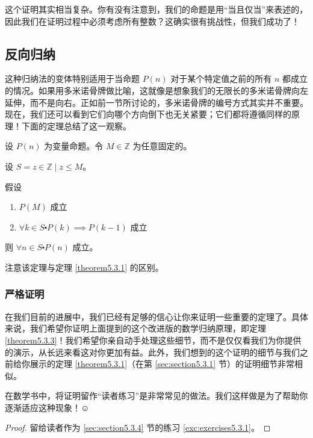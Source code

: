 这个证明其实相当复杂。你有没有注意到，我们的命题是用``当且仅当''来表述的，因此我们在证明过程中必须考虑所有整数？这确实很有挑战性，但我们成功了！

\subsection{反向归纳}

这种归纳法的变体特别适用于当命题 $P(n)$ 对于某个特定值之前的所有 $n$ 都成立的情况。如果用多米诺骨牌做比喻，这就像是想象我们的无限长的多米诺骨牌向左延伸，而不是向右。正如前一节所讨论的，多米诺骨牌的编号方式其实并不重要。现在，我们还可以看到它们向哪个方向倒下也无关紧要；它们都将遵循同样的原理！下面的定理总结了这一观察。

\begin{theorem}[反向归纳]\label{theorem5.3.3}
    设 $P(n)$ 为变量命题。令 $M \in \mathbb{Z}$ 为任意固定的。

    设 $S = {z \in \mathbb{Z} \mid z \le M}$。

    假设
    \begin{enumerate}[label=(\arabic*)]
        \item $P(M)$ 成立
        \item $\forall k \in S \centerdot P(k) \implies P(k - 1)$ 成立
    \end{enumerate}

    则 $\forall n \in S \centerdot P(n)$ 成立。
\end{theorem}

注意该定理与定理 \ref{theorem5.3.1} 的区别。

\subsubsection*{严格证明}

在我们目前的进展中，我们已经有足够的信心让你来证明一些重要的定理了。具体来说，我们希望你证明上面提到的这个改进版的数学归纳原理，即定理 \ref{theorem5.3.3}！我们希望你亲自动手处理这些细节，而不是仅仅看我们为你提供的演示，从长远来看这对你更加有益。此外，我们想到的这个证明的细节与我们之前给你展示的定理 \ref{theorem5.3.1}（在第 \ref{sec:section5.3.1} 节）的证明细节非常相似。

在数学书中，将证明留作``读者练习''是非常常见的做法。我们这样做是为了帮助你逐渐适应这种现象！$\smiley{}$

\begin{proof}
    留给读者作为 \ref{sec:section5.3.4} 节的练习 \ref{exc:exercises5.3.1}。
\end{proof}

